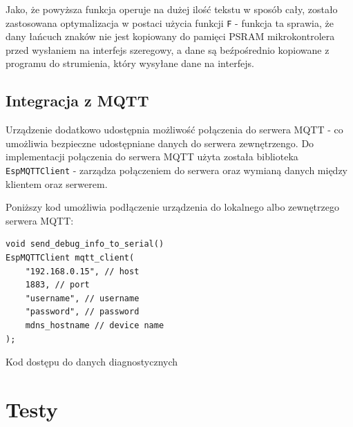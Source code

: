 \documentclass[12pt,a4paper]{article}
\begin{document}
Jako, że powyższa funkcja operuje na dużej ilość tekstu w sposób cały, zostało zastosowana optymalizacja w postaci użycia funkcji 
\texttt{F} - funkcja ta sprawia, że dany łańcuch znaków nie jest kopiowany do pamięci PSRAM mikrokontrolera przed wysłaniem na interfejs szeregowy, 
a dane są beźpośrednio kopiowane z programu do strumienia, który wysyłane dane na interfejs. 

\subsection{Integracja z MQTT}

Urządzenie dodatkowo udostępnia możliwość połączenia do serwera MQTT - co umożliwia bezpieczne udostępniane danych do serwera zewnętrzengo.
Do implementacji połączenia do serwera MQTT użyta została biblioteka \texttt{EspMQTTClient}\cite{esp32-mqtt-server-library} - 
zarządza połączeniem do serwera oraz wymianą danych między klientem oraz serwerem.

Poniższy kod umożliwia podłączenie urządzenia do lokalnego albo zewnętrzego serwera MQTT: 
\begin{code}[H]
\begin{verbatim}
void send_debug_info_to_serial()
EspMQTTClient mqtt_client(
    "192.168.0.15", // host
    1883, // port
    "username", // username
    "password", // password
    mdns_hostname // device name
);
\end{verbatim}
\caption{Kod dostępu do danych diagnostycznych}
\label{diagnostic-data-code}
\end{code}

\section{Testy}
\end{document}
